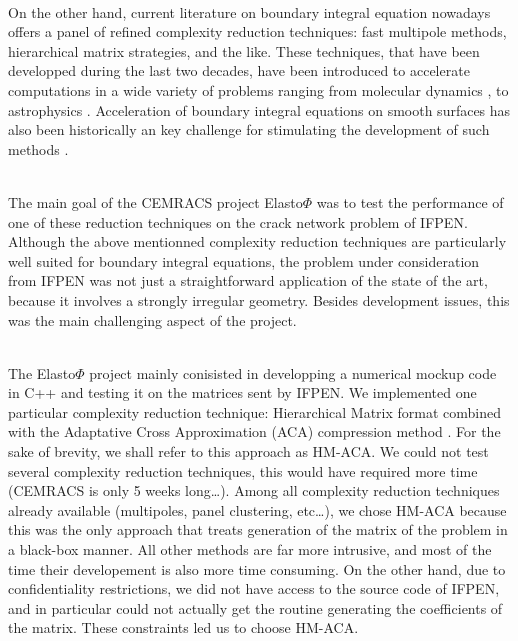 \quad\\
On the other hand, current literature on boundary integral equation nowadays offers a panel of refined complexity reduction 
techniques: fast multipole methods, hierarchical matrix strategies, and the like. These techniques, that have been developped 
during the last two decades, have been introduced to accelerate computations in a wide variety of problems ranging from molecular 
dynamics \cite{?}, to astrophysics \cite{?}. Acceleration of boundary integral equations on smooth surfaces has also been 
historically an key challenge for stimulating the development of such methods \cite{?}.

\quad\\
The main goal of the CEMRACS project Elasto$\Phi$ was to test the performance of one of these reduction techniques on the 
crack network problem of IFPEN. Although the above mentionned complexity reduction techniques are particularly well suited  
for boundary integral equations, the problem under consideration from IFPEN was not just a straightforward application of 
the state of the art, because it involves a strongly irregular geometry. Besides development issues, this was the main 
challenging  aspect of the project.

\quad\\
The Elasto$\Phi$ project mainly conisisted in developping a numerical mockup code in C++ and testing it on the matrices sent 
by IFPEN. We implemented one particular complexity reduction technique: Hierarchical Matrix \cite{?} format combined with the Adaptative Cross 
Approximation (ACA) compression method \cite{?}. For the sake of brevity, we shall refer to this approach as HM-ACA. We could not test several 
complexity reduction techniques, this would have required more time (CEMRACS is only 5 weeks long\dots). Among all complexity reduction techniques 
already available (multipoles, panel clustering, etc\dots), we chose HM-ACA because this was the only approach that treats generation 
of the matrix of the problem in a black-box manner. All other methods are far more intrusive, and most of the time their developement 
is also more time consuming. On the other hand, due to confidentiality restrictions, we did not have access to the source code of IFPEN, and 
in particular could not actually get the routine generating the coefficients of the matrix. These constraints led us to choose HM-ACA.


